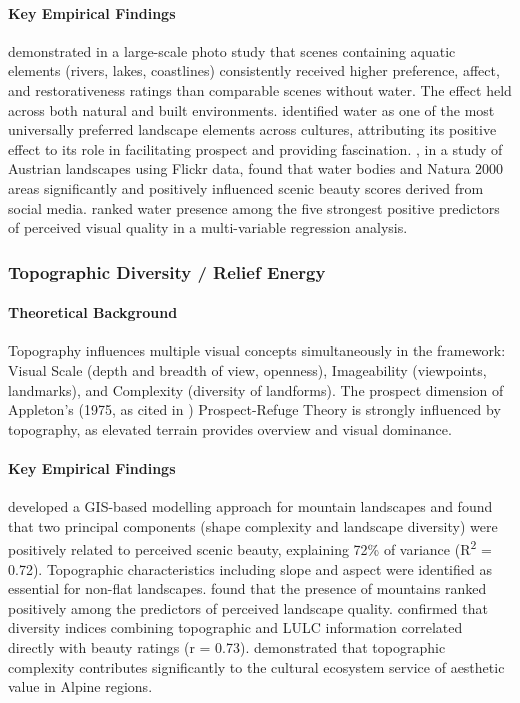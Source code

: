 \documentclass[hidelinks, 11pt]{article}
\begin{document}
\paragraph{Key Empirical Findings}
\citet{white_blue_2010} demonstrated in a large-scale photo study that scenes containing aquatic elements (rivers, lakes, coastlines) consistently received higher preference, affect, and restorativeness ratings than comparable scenes without water. The effect held across both natural and built environments. \citet{kaplan_experience_1989} identified water as one of the most universally preferred landscape elements across cultures, attributing its positive effect to its role in facilitating prospect and providing fascination. \citet{despotovic_beautiful_2025}, in a study of Austrian landscapes using Flickr data, found that water bodies and Natura 2000 areas significantly and positively influenced scenic beauty scores derived from social media. \citet{arriaza_assessing_2004} ranked water presence among the five strongest positive predictors of perceived visual quality in a multi-variable regression analysis.

\subsubsection{Topographic Diversity / Relief Energy}\label{sec:TDRE}
\paragraph{Theoretical Background}
Topography influences multiple visual concepts simultaneously in the \citet{ode_capturing_2008} framework: Visual Scale (depth and breadth of view, openness), Imageability (viewpoints, landmarks), and Complexity (diversity of landforms). The prospect dimension of Appleton's (1975, as cited in \citet{tveit_key_2006}) Prospect-Refuge Theory is strongly influenced by topography, as elevated terrain provides overview and visual dominance.

\paragraph{Key Empirical Findings}
\citet{schirpke_predicting_2013} developed a GIS-based modelling approach for mountain landscapes and found that two principal components (shape complexity and landscape diversity) were positively related to perceived scenic beauty, explaining 72\% of variance (R\textsuperscript{2} = 0.72). Topographic characteristics including slope and aspect were identified as essential for non-flat landscapes. \citet{arriaza_assessing_2004} found that the presence of mountains ranked positively among the predictors of perceived landscape quality. \citet{frank_assessment_2013} confirmed that diversity indices combining topographic and LULC information correlated directly with beauty ratings (r = 0.73). \citet{schirpke_cultural_2016} demonstrated that topographic complexity contributes significantly to the cultural ecosystem service of aesthetic value in Alpine regions.
\end{document}
